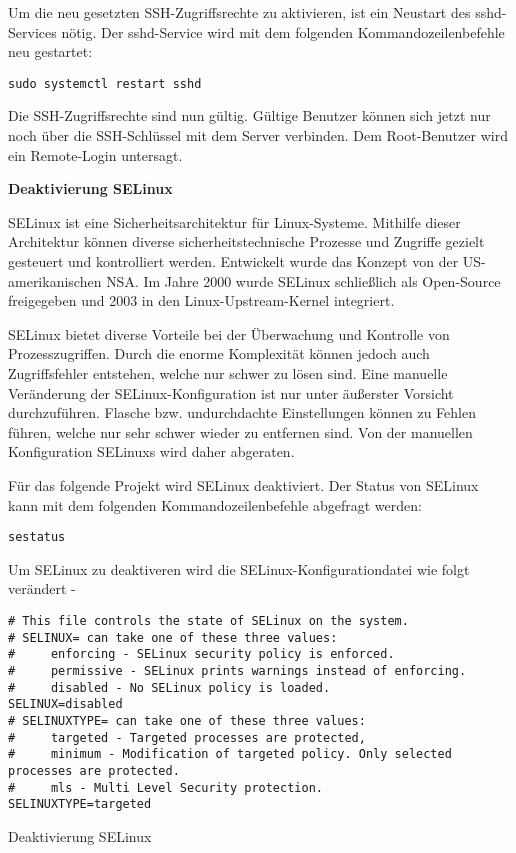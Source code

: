 Um die neu gesetzten SSH-Zugriffsrechte zu aktivieren, ist ein Neustart des sshd-Services nötig.
Der sshd-Service wird mit dem folgenden Kommandozeilenbefehle neu gestartet:

\texttt{sudo systemctl restart sshd}

Die SSH-Zugriffsrechte sind nun gültig.
Gültige Benutzer können sich jetzt nur noch über die SSH-Schlüssel mit dem Server verbinden.
Dem Root-Benutzer wird ein Remote-Login untersagt.

\textbf{Deaktivierung SELinux}

\ac{SELinux} ist eine Sicherheitsarchitektur für Linux-Systeme.
Mithilfe dieser Architektur können diverse sicherheitstechnische Prozesse und Zugriffe gezielt gesteuert und kontrolliert werden.
Entwickelt wurde das Konzept von der US-amerikanischen \ac{NSA}.
Im Jahre 2000 wurde SELinux schließlich als Open-Source freigegeben und 2003 in den Linux-Upstream-Kernel integriert.

SELinux bietet diverse Vorteile bei der Überwachung und Kontrolle von Prozesszugriffen.
Durch die enorme Komplexität können jedoch auch Zugriffsfehler entstehen, welche nur schwer zu lösen sind.
Eine manuelle Veränderung der SELinux-Konfiguration ist nur unter äußerster Vorsicht durchzuführen.
Flasche bzw. undurchdachte Einstellungen können zu Fehlen führen, welche nur sehr schwer wieder zu entfernen sind.
Von der manuellen Konfiguration SELinuxs wird daher abgeraten.

Für das folgende Projekt wird SELinux deaktiviert.
Der Status von SELinux kann mit dem folgenden Kommandozeilenbefehle abgefragt werden:

\texttt{sestatus}

Um SELinux zu deaktiveren wird die SELinux-Konfigurationdatei wie folgt verändert - 

\begin{code}
    \begin{verbatim}
# This file controls the state of SELinux on the system.
# SELINUX= can take one of these three values:
#     enforcing - SELinux security policy is enforced.
#     permissive - SELinux prints warnings instead of enforcing.
#     disabled - No SELinux policy is loaded.
SELINUX=disabled
# SELINUXTYPE= can take one of these three values:
#     targeted - Targeted processes are protected,
#     minimum - Modification of targeted policy. Only selected processes are protected. 
#     mls - Multi Level Security protection.
SELINUXTYPE=targeted
    \end{verbatim}
    \caption[Deaktivierung SELinux]{Deaktivierung SELinux}
    \label{Deaktivierung SELinux}
\end{code}



